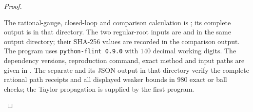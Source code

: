 \begin{proof}
\begin{enumerate}[label=\arabic*.]
The rational-gauge, closed-loop and comparison calculation is
;
its complete output is
 in that directory.
The two regular-root inputs are
 and
 in the same output directory;
their SHA-256 values are recorded in the comparison output.
The program uses \texttt{python-flint 0.9.0} with $140$ decimal
working digits.  The dependency versions, reproduction command,
exact method and input paths are given in
.
The separate  and its
JSON output in that directory verify the complete rational path
receipts and all displayed weaker bounds in $980$ exact or ball
checks; the Taylor propagation is supplied by the first program.
\end{enumerate}
\end{proof}
